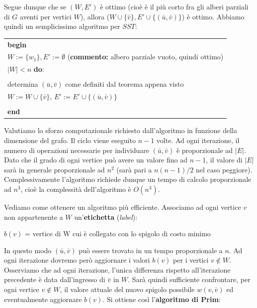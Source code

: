 \documentclass[11pt]{book}
\begin{document}
Segue dunque che se $(W,E')$ \`e ottimo (cio\`e \`e il pi\`u corto fra
gli alberi parziali di $G$ aventi per vertici $W$), allora ($W \cup \{
\bar{v}\}, E' \cup \{ (\bar{u}, \bar{v}) \}$) \`e ottimo. Abbiamo
quindi un semplicissimo algoritmo per $SST$:

\vspace{11pt}
\begin{center}
  \begin{tabular}{||l||}
    \hline\hline
    {\bf begin}\\
    \phantom{aa}$W := \{ w_1 \}, E' := \emptyset$ ({\bf commento:} albero parziale
    vuoto, quindi ottimo)\\
    \phantom{aa}{\bf while} $|W| < n$ {\bf do}:\\
    \phantom{aaaa}{\bf begin}\\
    \phantom{aaaaaa}determina $(\bar{u},\bar{v})$ come definiti dal teorema appena
    visto\\
    \phantom{aaaaaa}$W := W \cup \{ \bar{v} \}$, $E' := E' \cup \{
    (\bar{u},\bar{v})\}$\\
    \phantom{aaaa}{\bf end}\\
    {\bf end}\\
    \hline\hline
  \end{tabular}
\end{center}
\vspace{11pt}

Valutiamo lo sforzo computazionale richiesto dall'algoritmo in
funzione della dimensione del grafo. Il ciclo viene eseguito $n-1$
volte. Ad ogni iterazione, il numero di operazioni necessarie per
individuare $(\bar{u},\bar{v})$ \`e proporzionale ad $|E|$. Dato che
il grado di ogni vertice pu\`o avere un valore fino ad $n-1$, il
valore di $|E|$ sar\`a in generale proporzionale ad $n^2$ (sar\`a pari
a $n(n-1)/2$ nel caso peggiore). Complessivamente l'algoritmo richiede
dunque un tempo di calcolo proporzionale ad $n^3$, cio\`e la
complessit\`a dell'algoritmo \`e $O(n^3)$.

Vediamo come ottenere un algoritmo pi\`u efficiente. Associamo ad ogni
vertice $v$ non appartenente a $W$ un'{\bf etichetta} ({\em label}): 

\begin{center}
$b(v)$ = vertice di W cui \`e collegato con lo spigolo di costo minimo
\end{center}

In questo modo $(\bar{u},\bar{v})$ pu\`o essere trovato in un tempo
proporzionale a $n$. Ad ogni iterazione dovremo per\`o aggiornare i
valori $b(v)$ per i vertici $v \not\in W$. Osserviamo che ad ogni
iterazione, l'unica differenza rispetto all'iterazione precedente \`e
data dall'ingresso di $\bar{v}$ in $W$. Sar\`a quindi sufficiente
confrontare, per ogni vertice $v \not\in W$, il valore attuale del
nuovo spigolo possibile $w(v,\bar{v})$ ed eventualmente aggiornare
$b(v)$. Si ottiene cos\`i l'{\bf algoritmo di Prim}:
\end{document}
